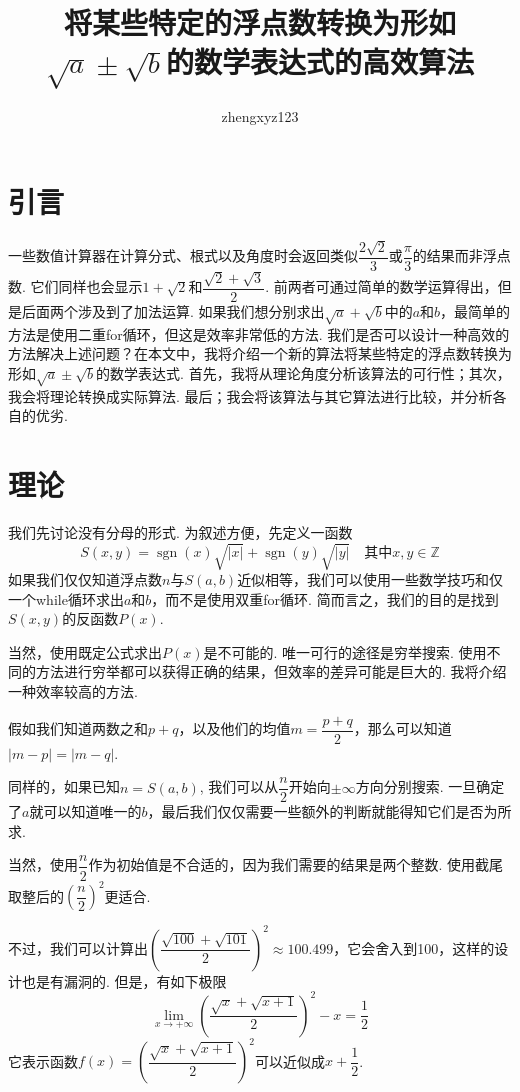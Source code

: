 \documentclass[a4paper, UTF8]{ctexart}
\title{将某些特定的浮点数转换为形如$\sqrt{a}\pm\sqrt{b}$的数学表达式的高效算法}
\author{zhengxyz123}
\DeclareMathOperator{\sgn}{\mathrm{sgn}}
\begin{document}
\maketitle

\section{引言}
一些数值计算器在计算分式、根式以及角度时会返回类似$\dfrac{2\sqrt{2}}{3}$或$\dfrac{\pi}{3}$的结果而非浮点数. 它们同样也会显示$1+\sqrt{2}$和$\dfrac{\sqrt{2}+\sqrt{3}}{2}$. 前两者可通过简单的数学运算得出，但是后面两个涉及到了加法运算. 如果我们想分别求出$\sqrt{a}+\sqrt{b}$中的$a$和$b$，最简单的方法是使用二重for循环，但这是效率非常低的方法. 我们是否可以设计一种高效的方法解决上述问题？在本文中，我将介绍一个新的算法将某些特定的浮点数转换为形如$\sqrt{a}\pm\sqrt{b}$的数学表达式. 首先，我将从理论角度分析该算法的可行性；其次，我会将理论转换成实际算法. 最后；我会将该算法与其它算法进行比较，并分析各自的优劣.

\section{理论}
我们先讨论没有分母的形式. 为叙述方便，先定义一函数\[S(x,y)=\sgn(x)\sqrt{|x|}+\sgn(y)\sqrt{|y|} \quad\mbox{其中}x,y\in\mathbb{Z}\]如果我们仅仅知道浮点数$n$与$S(a,b)$近似相等，我们可以使用一些数学技巧和仅一个while循环求出$a$和$b$，而不是使用双重for循环. 简而言之，我们的目的是找到$S(x,y)$的反函数$P(x)$.

当然，使用既定公式求出$P(x)$是不可能的. 唯一可行的途径是穷举搜索. 使用不同的方法进行穷举都可以获得正确的结果，但效率的差异可能是巨大的. 我将介绍一种效率较高的方法.

假如我们知道两数之和$p+q$，以及他们的均值$m=\dfrac{p+q}{2}$，那么可以知道$|m-p|=|m-q|$.

同样的，如果已知$n=S(a,b)$, 我们可以从$\dfrac{n}{2}$开始向$\pm\infty$方向分别搜索. 一旦确定了$a$就可以知道唯一的$b$，最后我们仅仅需要一些额外的判断就能得知它们是否为所求.

当然，使用$\dfrac{n}{2}$作为初始值是不合适的，因为我们需要的结果是两个整数. 使用截尾取整后的$\left(\dfrac{n}{2}\right)^2$更适合.

不过，我们可以计算出$\left(\dfrac{\sqrt{100}+\sqrt{101}}{2}\right)^2\approx100.499$，它会舍入到100，这样的设计也是有漏洞的. 但是，有如下极限\[\lim_{x\to+\infty}\left(\frac{\sqrt{x}+\sqrt{x+1}}{2}\right)^2-x=\frac{1}{2}\]它表示函数$f(x)=\left(\dfrac{\sqrt{x}+\sqrt{x+1}}{2}\right)^2$可以近似成$x+\dfrac{1}{2}$.
\end{document}
